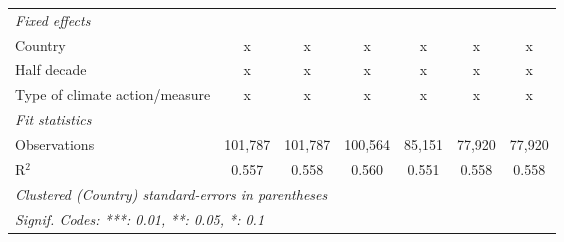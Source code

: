 \begin{tabular}{lcccccc}
   \emph{Fixed effects}\\
   Country                                     & x       & x             & x            & x            & x            & x\\  
   Half decade                                 & x       & x             & x            & x            & x            & x\\  
   Type of climate action/measure              & x       & x             & x            & x            & x            & x\\  
   \midrule \emph{Fit statistics}\\
   Observations                                & 101,787 & 101,787       & 100,564      & 85,151       & 77,920       & 77,920\\  
   R$^2$                                       & 0.557   & 0.558         & 0.560        & 0.551        & 0.558        & 0.558\\  
   \midrule
   \multicolumn{7}{l}{\emph{Clustered (Country) standard-errors in parentheses}}\\
   \multicolumn{7}{l}{\emph{Signif. Codes: ***: 0.01, **: 0.05, *: 0.1}}\\
\end{tabular}
\par\endgroup


